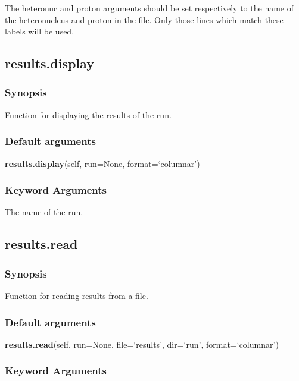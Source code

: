 The heteronuc and proton arguments should be set respectively to the name of the
heteronucleus and proton in the file.  Only those lines which match these labels will be
used.


\newpage

\subsection{results.display}


\subsubsection{Synopsis}

Function for displaying the results of the run.

\subsubsection{Default arguments}

\textsf{\textbf{results.display}(self, run=None, format=`columnar')}


\subsubsection{Keyword Arguments}

  The name of the run.


\newpage

\subsection{results.read}


\subsubsection{Synopsis}

Function for reading results from a file.

\subsubsection{Default arguments}

\textsf{\textbf{results.read}(self, run=None, file=`results', dir=`run', format=`columnar')}


\subsubsection{Keyword Arguments}

